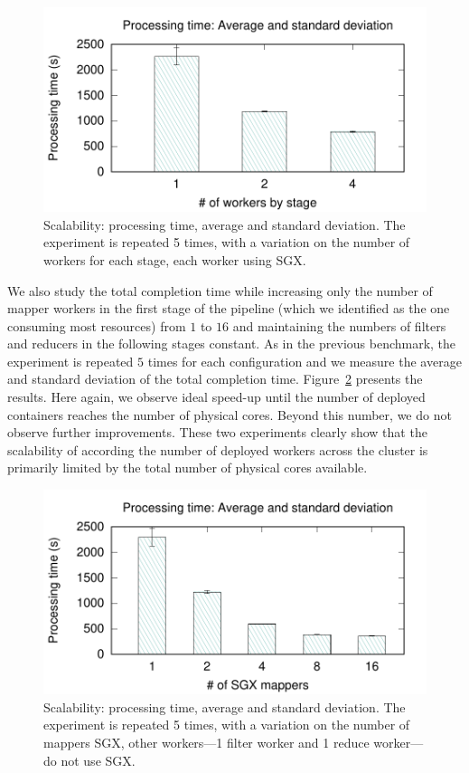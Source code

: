 \begin{figure}[H]
  \centering  \includegraphics[width=0.75\linewidth]{Figures/plots/secure_streams/scalability/sgxfull_scalability}
  \caption{Scalability: processing time, average and standard deviation. The experiment is repeated 5 times, with a variation on the number of workers for each stage, each worker using SGX.}
  \label{fig:scalability:sgxfull}
\end{figure}

We also study the total completion time while increasing only the number of mapper workers in the first stage of the pipeline (which we identified as the one consuming most resources) from $1$ to $16$ and maintaining the numbers of filters and reducers in the following stages constant.
As in the previous benchmark, the experiment is repeated $5$ times for each configuration and we measure the average and standard deviation of the total completion time.
Figure~\ref{fig:scalability:sgxmapper} presents the results.
Here again, we observe ideal speed-up until the number of deployed containers reaches the number of physical cores.
Beyond this number, we do not observe further improvements.
These two experiments clearly show that the scalability of \SS{} according the number of deployed workers across the cluster is primarily limited by the total number of physical cores available.

\begin{figure}[H]
  \centering  \includegraphics[width=0.75\linewidth]{Figures/plots/secure_streams/scalability/sgxmapper_scalability}
  \caption{Scalability: processing time, average and standard deviation. The experiment is repeated 5 times, with a variation on the number of mappers SGX, other workers---1 filter worker and 1 reduce worker---do not use SGX.}
  \label{fig:scalability:sgxmapper}
\end{figure}


